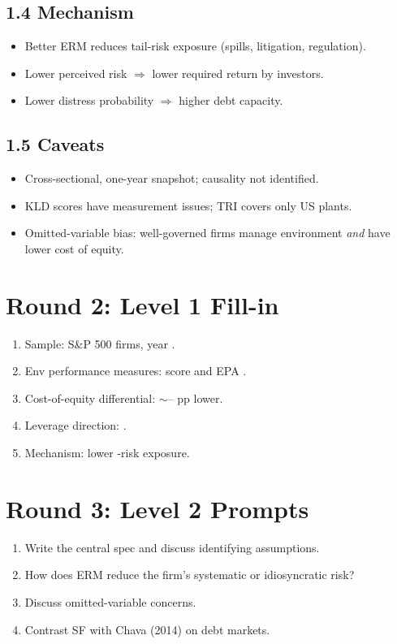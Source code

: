 \documentclass[11pt]{article}
\newcommand{\blank}[1]{\underline{\hspace{#1}}}
\begin{document}
\subsection*{1.4 Mechanism}
\begin{itemize}
\item Better ERM reduces tail-risk exposure (spills, litigation, regulation).
\item Lower perceived risk $\Rightarrow$ lower required return by investors.
\item Lower distress probability $\Rightarrow$ higher debt capacity.
\end{itemize}

\subsection*{1.5 Caveats}
\begin{alertbox}
\begin{itemize}
\item Cross-sectional, one-year snapshot; causality not identified.
\item KLD scores have measurement issues; TRI covers only US plants.
\item Omitted-variable bias: well-governed firms manage environment \emph{and} have lower cost of equity.
\end{itemize}
\end{alertbox}

\section*{Round 2: Level 1 Fill-in}
\begin{enumerate}
\item Sample: \blank{1cm} S\&P 500 firms, year \blank{1cm}.
\item Env performance measures: \blank{1cm} score and EPA \blank{1cm}.
\item Cost-of-equity differential: $\sim$\blank{1cm}--\blank{1cm} pp lower.
\item Leverage direction: \blank{1cm}.
\item Mechanism: lower \blank{1cm}-risk exposure.
\end{enumerate}

\section*{Round 3: Level 2 Prompts}
\begin{enumerate}
\item Write the central spec and discuss identifying assumptions.
\item How does ERM reduce the firm's systematic or idiosyncratic risk?
\item Discuss omitted-variable concerns.
\item Contrast SF with Chava (2014) on debt markets.
\end{enumerate}
\end{document}
